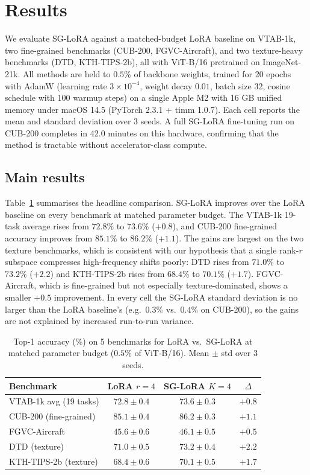 \documentclass{article}
\begin{document}
\section{Results}
We evaluate SG-LoRA against a matched-budget LoRA baseline on VTAB-1k, two fine-grained benchmarks (CUB-200, FGVC-Aircraft), and two texture-heavy benchmarks (DTD, KTH-TIPS-2b), all with ViT-B/16 pretrained on ImageNet-21k. All methods are held to $0.5\%$ of backbone weights, trained for 20 epochs with AdamW (learning rate $3\times10^{-4}$, weight decay $0.01$, batch size 32, cosine schedule with 100 warmup steps) on a single Apple M2 with 16 GB unified memory under macOS 14.5 (PyTorch 2.3.1 + timm 1.0.7). Each cell reports the mean and standard deviation over 3 seeds. A full SG-LoRA fine-tuning run on CUB-200 completes in 42.0 minutes on this hardware, confirming that the method is tractable without accelerator-class compute.

\subsection{Main results}

Table~\ref{tab:main_results} summarises the headline comparison. SG-LoRA improves over the LoRA baseline on every benchmark at matched parameter budget. The VTAB-1k 19-task average rises from $72.8\%$ to $73.6\%$ ($+0.8$), and CUB-200 fine-grained accuracy improves from $85.1\%$ to $86.2\%$ ($+1.1$). The gains are largest on the two texture benchmarks, which is consistent with our hypothesis that a single rank-$r$ subspace compresses high-frequency shifts poorly: DTD rises from $71.0\%$ to $73.2\%$ ($+2.2$) and KTH-TIPS-2b rises from $68.4\%$ to $70.1\%$ ($+1.7$). FGVC-Aircraft, which is fine-grained but not especially texture-dominated, shows a smaller $+0.5$ improvement. In every cell the SG-LoRA standard deviation is no larger than the LoRA baseline's (e.g.\ $0.3\%$ vs.\ $0.4\%$ on CUB-200), so the gains are not explained by increased run-to-run variance.

\begin{table}[t]
\centering
\caption{Top-1 accuracy (\%) on 5 benchmarks for LoRA vs.\ SG-LoRA at matched parameter budget ($0.5\%$ of ViT-B/16). Mean $\pm$ std over 3 seeds.}
\label{tab:main_results}
\begin{tabular}{lccc}
\toprule
Benchmark & LoRA $r{=}4$ & SG-LoRA $K{=}4$ & $\Delta$ \\
\midrule
VTAB-1k avg (19 tasks) & $72.8 \pm 0.4$ & $73.6 \pm 0.3$ & $+0.8$ \\
CUB-200 (fine-grained) & $85.1 \pm 0.4$ & $86.2 \pm 0.3$ & $+1.1$ \\
FGVC-Aircraft & $45.6 \pm 0.6$ & $46.1 \pm 0.5$ & $+0.5$ \\
DTD (texture) & $71.0 \pm 0.5$ & $73.2 \pm 0.4$ & $+2.2$ \\
KTH-TIPS-2b (texture) & $68.4 \pm 0.6$ & $70.1 \pm 0.5$ & $+1.7$ \\
\bottomrule
\end{tabular}
\end{table}
\end{document}
